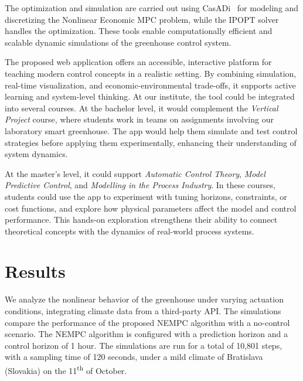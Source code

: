 \documentclass[conference]{IEEEtran}
\begin{document}
The optimization and simulation are carried out using CasADi~\cite{Andersson2019} for modeling and discretizing the Nonlinear Economic MPC problem, while the IPOPT solver~\cite{Wachter2006} handles the optimization. These tools enable computationally efficient and scalable dynamic simulations of the greenhouse control system.

The proposed web application offers an accessible, interactive platform for teaching modern control concepts in a realistic setting. By combining simulation, real-time visualization, and economic-environmental trade-offs, it supports active learning and system-level thinking. At our institute, the tool could be integrated into several courses. At the bachelor level, it would complement the \textit{Vertical Project} course, where students work in teams on assignments involving our laboratory smart greenhouse. The app would help them simulate and test control strategies before applying them experimentally, enhancing their understanding of system dynamics.

At the master's level, it could support \textit{Automatic Control Theory}, \textit{Model Predictive Control}, and \textit{Modelling in the Process Industry}. In these courses, students could use the app to experiment with tuning horizons, constraints, or cost functions, and explore how physical parameters affect the model and control performance. This hands-on exploration strengthens their ability to connect theoretical concepts with the dynamics of real-world process systems.

\section{Results}
We analyze the nonlinear behavior of the greenhouse under varying actuation conditions, integrating climate data from a third-party API\@. The simulations compare the performance of the proposed NEMPC algorithm with a no-control scenario. The NEMPC algorithm is configured with a prediction horizon and a control horizon of 1 hour. The simulations are run for a total of 10,801 steps, with a sampling time of 120 seconds, under a mild climate of Bratislava (Slovakia) on the 11\textsuperscript{th} of October.
\end{document}
